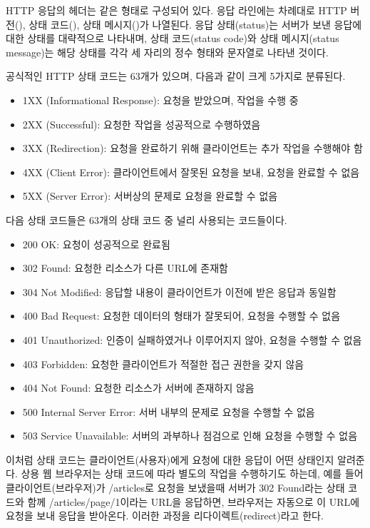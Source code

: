 HTTP 응답의 헤더는 \과 같은 형태로 구성되어 있다. 응답 라인에는 차례대로 HTTP 버전(), 상태 코드(), 상태 메시지()가 나열된다. 응답 상태(status)는 서버가 보낸 응답에 대한 상태를 대략적으로 나타내며, 상태 코드(status code)와 상태 메시지(status message)는 해당 상태를 각각 세 자리의 정수 형태와 문자열로 나타낸 것이다.

공식적인 HTTP 상태 코드는 63개가 있으며, 다음과 같이 크게 5가지로 분류된다.

\begin{itemize}
    \item 1XX (Informational Response): 요청을 받았으며, 작업을 수행 중
    \item 2XX (Successful): 요청한 작업을 성공적으로 수행하였음
    \item 3XX (Redirection): 요청을 완료하기 위해 클라이언트는 추가 작업을 수행해야 함
    \item 4XX (Client Error): 클라이언트에서 잘못된 요청을 보내, 요청을 완료할 수 없음
    \item 5XX (Server Error): 서버상의 문제로 요청을 완료할 수 없음
\end{itemize}

다음 상태 코드들은 63개의 상태 코드 중 널리 사용되는 코드들이다.

\begin{itemize}
    \item 200 OK: 요청이 성공적으로 완료됨
    \item 302 Found: 요청한 리소스가 다른 URL에 존재함
    \item 304 Not Modified: 응답할 내용이 클라이언트가 이전에 받은 응답과 동일함
    \item 400 Bad Request: 요청한 데이터의 형태가 잘못되어, 요청을 수행할 수 없음
    \item 401 Unauthorized: 인증이 실패하였거나 이루어지지 않아, 요청을 수행할 수 없음
    \item 403 Forbidden: 요청한 클라이언트가 적절한 접근 권한을 갖지 않음
    \item 404 Not Found: 요청한 리소스가 서버에 존재하지 않음
    \item 500 Internal Server Error: 서버 내부의 문제로 요청을 수행할 수 없음
    \item 503 Service Unavailable: 서버의 과부하나 점검으로 인해 요청을 수행할 수 없음
\end{itemize}

이처럼 상태 코드는 클라이언트(사용자)에게 요청에 대한 응답이 어떤 상태인지 알려준다. 상용 웹 브라우저는 상태 코드에 따라 별도의 작업을 수행하기도 하는데, 예를 들어 클라이언트(브라우저)가 /articles로 요청을 보냈을때 서버가 302 Found라는 상태 코드와 함께 /articles/page/1이라는 URL을 응답하면, 브라우저는 자동으로 이 URL에 요청을 보내 응답을 받아온다. 이러한 과정을 리다이렉트(redirect)라고 한다.

